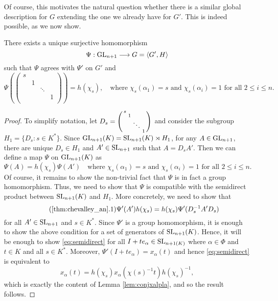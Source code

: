 Of course, this motivates the natural question whether there is a similar global description for $G$ extending the one we already have for $G'$. This is indeed possible, as we now show.

\begin{theorem}\label{thm:chevalley_an}
    There exists a unique surjective homomorphism 
    $$\Psi:\mathrm{GL}_{n+1}\longrightarrow G=\langle G',H\rangle$$
    such that $\Psi$ agrees with $\Psi'$ on $G'$ and 
    $$\Psi\left(\begin{pmatrix}
        s &  & & \\
         & 1 & & \\
         & & \ddots & \\
         & & & 1\\
    \end{pmatrix}\right)=h(\chi_s),\quad\text{where }\chi_s(\alpha_1)=s \text{ and }\chi_s(\alpha_i)=1 \text{ for all }2\leq i\leq n.$$
\end{theorem}
\begin{proof}
    To simplify notation, let $D_s=\begin{psmallmatrix}
        s &  & & \\
         & 1 & & \\
         & & \ddots & \\
         & & & 1\\
    \end{psmallmatrix}$ and consider the subgroup $H_1=\{D_s:s\in K^*\}$. Since 
    $\mathrm{GL}_{n+1}(K)=\mathrm{SL}_{n+1}(K)\rtimes H_1$, for any $A\in\mathrm{GL}_{n+1}$, there are unique $D_s\in H_1$ and $A'\in\mathrm{SL}_{n+1}$ such that $A=D_s A'$. Then we can define a map $\Psi$ on $\mathrm{GL}_{n+1}(K)$ as 
    $$\Psi(A)=h(\chi_s)\Psi(A')\quad\text{where }\chi_s(\alpha_1)=s \text{ and }\chi_s(\alpha_i)=1 \text{ for all }2\leq i\leq n.$$
    Of course, it remains to show the non-trivial fact that $\Psi$ is in fact a group homomorphism. Thus, we need to show that $\Psi$ is compatible with the semidirect product between $\mathrm{SL}_{n+1}(K)$ and $H_1$. More concretely, we need to show that 
    \begin{equation}\tag{\ref{thm:chevalley_an}.1}\label{eq:semidirect}
        \Psi'(A')h(\chi_s)=h(\chi_s)\Psi'(D_s^{-1}A'D_s)
    \end{equation}
    for all $A'\in\mathrm{SL}_{n+1}$ and $s\in K^*$. Since $\Psi'$ is a group homomorphism, it is enough to show the above condition for a set of generators of $\mathrm{SL}_{n+1}(K)$. Hence, it will be enough to show \eqref{eq:semidirect} for all $I+t e_\alpha\in\mathrm{SL}_{n+1(K)}$ where $\alpha\in\Phi$ and $t\in K$ and all $s\in K^*$. Moreover, $\Psi'(I+t e_\alpha)=x_\alpha(t)$ and hence \eqref{eq:semidirect} is equivalent to 
    $$x_\alpha(t)=h(\chi_s)x_\alpha(\chi(s)^{-1}t)h(\chi_s)^{-1},$$
    which is exactly the content of Lemma \ref{lem:conjxalpla}, and so the result follows. 
\end{proof}